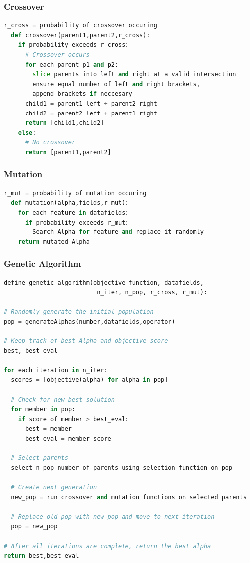 \documentclass[a4paper,12pt]{report}
\numberwithin{equation}{section}
\theoremstyle{definition}
\begin{document}
\subsubsection{Crossover}
\begin{lstlisting}[language=Python, caption=Crossover Function Pseudocode, basicstyle=\footnotesize\ttfamily]
  r_cross = probability of crossover occuring
  def crossover(parent1,parent2,r_cross):
    if probability exceeds r_cross:
      # Crossover occurs
      for each parent p1 and p2:
        slice parents into left and right at a valid intersection
        ensure equal number of left and right brackets, 
        append brackets if neccesary
      child1 = parent1 left + parent2 right
      child2 = parent2 left + parent1 right
      return [child1,child2]
    else:
      # No crossover
      return [parent1,parent2]
\end{lstlisting}

\subsubsection{Mutation}

\begin{lstlisting}[language=Python, caption=Mutation Function Pseudocode, basicstyle=\footnotesize\ttfamily]
  r_mut = probability of mutation occuring
  def mutation(alpha,fields,r_mut):
    for each feature in datafields:
      if probability exceeds r_mut:
        Search Alpha for feature and replace it randomly
    return mutated Alpha
\end{lstlisting}

\subsubsection{Genetic Algorithm}

\begin{lstlisting}[language=Python, caption=Genetic Algorithm Pseudocode, basicstyle=\footnotesize\ttfamily]
define genetic_algorithm(objective_function, datafields, 
                          n_iter, n_pop, r_cross, r_mut):

# Randomly generate the initial population
pop = generateAlphas(number,datafields,operator)

# Keep track of best Alpha and objective score
best, best_eval

for each iteration in n_iter:
  scores = [objective(alpha) for alpha in pop]

  # Check for new best solution
  for member in pop:
    if score of member > best_eval:
      best = member
      best_eval = member score

  # Select parents
  select n_pop number of parents using selection function on pop

  # Create next generation
  new_pop = run crossover and mutation functions on selected parents

  # Replace old pop with new pop and move to next iteration
  pop = new_pop

# After all iterations are complete, return the best alpha
return best,best_eval
\end{lstlisting}
\end{document}
